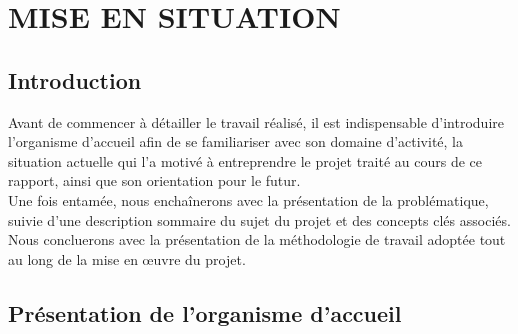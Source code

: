 
\setcounter{mtc}{3} %
\chapter{MISE EN SITUATION}
\minitoc  %

\graphicspath{{Chapitre1/figures/}}
\pagestyle{fancy}
\fancyhf{}
\fancyhead[R]{\bfseries\rightmark}
\fancyfoot[R]{\thepage}
\renewcommand{\headrulewidth}{0.5pt}
\renewcommand{\footrulewidth}{0pt}
\renewcommand{\chaptermark}[1]{\markboth{\MakeUppercase{\chaptername~\thechapter. #1 }}{}}
\renewcommand{\sectionmark}[1]{\markright{\thechapter.\thesection~ #1}}

\begin{spacing}{1.5}

\section*{Introduction}
Avant de commencer à détailler le travail réalisé, il est indispensable d'introduire l'organisme d'accueil afin de se familiariser avec son domaine d'activité, la situation actuelle qui l'a motivé à entreprendre le projet traité au cours de ce rapport, ainsi que son orientation pour le futur.\\
Une fois entamée, nous enchaînerons avec la présentation de la problématique, suivie d'une description sommaire du sujet du projet et des concepts clés associés. Nous concluerons avec la présentation de la méthodologie de travail adoptée tout au long de la mise en œuvre du projet.


\section{Présentation de l'organisme d'accueil}


\end{spacing}
